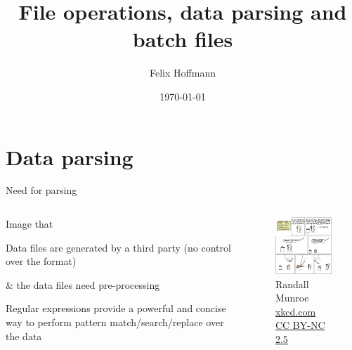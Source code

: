 \documentclass[xcolor=table,10pt]{beamer}
\title {File operations, data parsing and batch files}
\author[Felix Hoffmann]{Felix Hoffmann}
\institute[BCF]{Bernstein Center Freiburg}
\date{\today}
\begin{document}










\section{Data parsing}

\begin{frame}{Need for parsing}
  \begin{columns}[T]
    \begin{column}{.4\textwidth}
      Image that
      \vspace{0.5cm}
      \begin{arrowlist}
        \itemsep8pt
        \item[]<1-> Data files are generated by a third party (no control
          over the format)
        \item[]<2-> \& the data files need pre-processing
          \vspace{0.3cm}
        \item<3-> Regular expressions provide a powerful and concise way
          to perform pattern match/search/replace over the data
      \end{arrowlist}

    \end{column}
    \begin{column}{.6\textwidth}
      \begin{figure}
        \includegraphics[width=6.4cm]{xkcd208.png}
        \caption*{\tiny  \textcopyright Randall Munroe \href{http://xkcd.com/208/}{xkcd.com} \href{http://creativecommons.org/licenses/by-nc/2.5/}{CC BY-NC 2.5}}
      \end{figure}
    \end{column}    

  \end{columns}
\end{frame}
\end{document}
